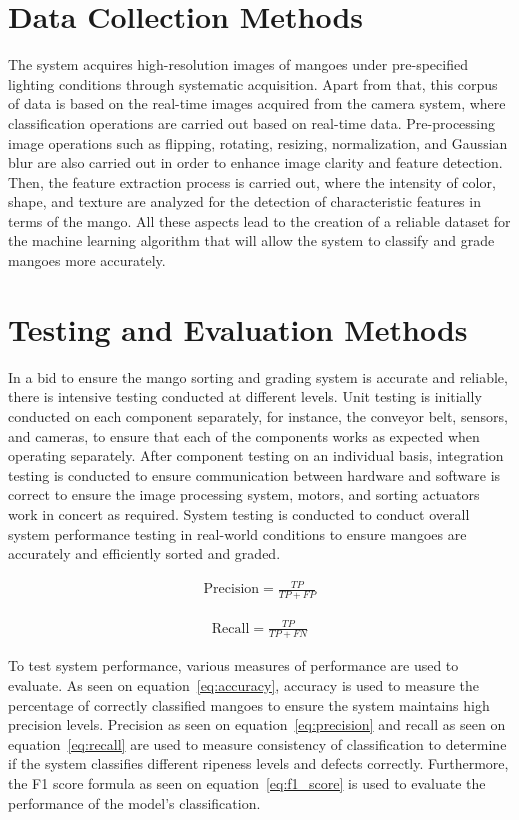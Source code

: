 \section{Data Collection Methods}
The system acquires high-resolution images of mangoes under pre-specified lighting conditions through systematic acquisition. Apart from that, this corpus of data is based on the real-time images acquired from the camera system, where classification operations are carried out based on real-time data. Pre-processing image operations such as flipping, rotating, resizing, normalization, and Gaussian blur are also carried out in order to enhance image clarity and feature detection. Then, the feature extraction process is carried out, where the intensity of color, shape, and texture are analyzed for the detection of characteristic features in terms of the mango. All these aspects lead to the creation of a reliable dataset for the machine learning algorithm that will allow the system to classify and grade mangoes more accurately.

\section{Testing and Evaluation Methods}
In a bid to ensure the mango sorting and grading system is accurate and reliable, there is intensive testing conducted at different levels. Unit testing is initially conducted on each component separately, for instance, the conveyor belt, sensors, and cameras, to ensure that each of the components works as expected when operating separately. After component testing on an individual basis, integration testing is conducted to ensure communication between hardware and software is correct to ensure the image processing system, motors, and sorting actuators work in concert as required. System testing is conducted to conduct overall system performance testing in real-world conditions to ensure mangoes are accurately and efficiently sorted and graded.

\begin{eqnarray}
	\text{Precision} = \frac{TP}{TP + FP}
	\label{eq:precision}
\end{eqnarray}

\begin{eqnarray}
	\text{Recall} = \frac{TP}{TP + FN}
	\label{eq:recall}
\end{eqnarray}


To test system performance, various measures of performance are used to evaluate. As seen on equation~\ref{eq:accuracy}, accuracy is used to measure the percentage of correctly classified mangoes to ensure the system maintains high precision levels. Precision as seen on equation~\ref{eq:precision} and recall as seen on equation~\ref{eq:recall} are used to measure consistency of classification to determine if the system classifies different ripeness levels and defects correctly. Furthermore, the F1 score formula as seen on equation~\ref{eq:f1_score} is used to evaluate the performance of the model's classification. 

